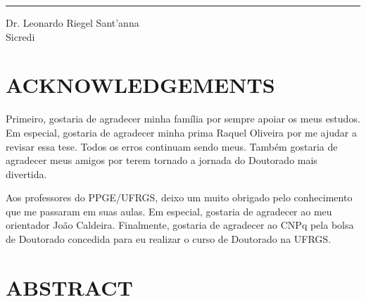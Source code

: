 \documentclass[12pt,oneside,a4paper]{memoir}
\begin{document}
\vspace{1 em}
\noindent
\rule{\textwidth}{1pt}
Dr. Leonardo Riegel Sant'anna\\
Sicredi\\

\clearpage

\chapter*{ACKNOWLEDGEMENTS} 

Primeiro, gostaria de agradecer minha família por sempre apoiar os meus estudos.
Em especial, gostaria de agradecer minha prima Raquel Oliveira por me ajudar a revisar essa tese.
Todos os erros continuam sendo meus.
Também gostaria de agradecer meus amigos por terem tornado a jornada do Doutorado mais divertida.

Aos professores do PPGE/UFRGS, deixo um muito obrigado pelo conhecimento que me passaram em suas aulas.
Em especial, gostaria de agradecer ao meu orientador João Caldeira.
Finalmente, gostaria de agradecer ao CNPq pela bolsa de Doutorado concedida para eu realizar o curso de Doutorado na UFRGS.

\clearpage

\chapter*{ABSTRACT} 
\end{document}
